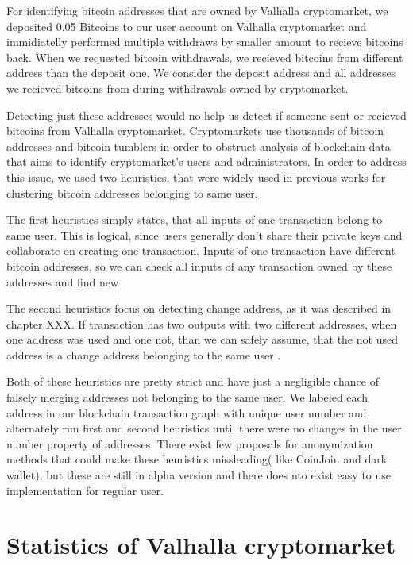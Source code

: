 \documentclass[
  digital, %
  table,   %
  lof,     %
  lot,     %
  oneside
]{fithesis3}
\begin{document}
For identifying bitcoin addresses that are owned by Valhalla cryptomarket, we 
deposited 0.05 Bitcoins to our user account on Valhalla cryptomarket and immidiatelly
performed multiple withdraws by smaller amount to recieve bitcoins back.
When we requested bitcoin withdrawals, we recieved bitcoins from different address
than the deposit one. We consider the deposit address and all addresses we recieved
bitcoins from during withdrawals owned by cryptomarket.

Detecting just these addresses would no help us detect
if someone sent or recieved bitcoins from Valhalla cryptomarket.
Cryptomarkets use thousands of bitcoin addresses and
bitcoin tumblers in order to obstruct analysis of blockchain data
that aims to identify cryptomarket's users and administrators.
In order to address this issue, we used two heuristics, that were widely used
in previous works \parencite{androulaki2013evaluating}\parencite{reid2013analysis}
for clustering bitcoin addresses belonging to same user.

The first heuristics simply states, that all inputs of one transaction belong to same user. This is logical,
since users generally don't share their private keys and collaborate on creating one transaction.
Inputs of one transaction have different bitcoin addresses, so we can check all inputs of any transaction
owned by these addresses and find new 

The second heuristics focus on detecting change address, as it was described in chapter XXX.
If transaction has two outputs with two different addresses, when one address was used and one not,
than we can safely assume, that the not used address is a change address belonging to the same user \parencite{androulaki2013evaluating}.

Both of these heuristics are pretty strict and have just a negligible chance of falsely merging
addresses not belonging to the same user.
We labeled each address in our blockchain transaction graph with unique user number
and alternately run first and second heuristics until there were no changes in the user number property of addresses.
There exist few proposals for anonymization methods that could make
these heuristics missleading( like CoinJoin and dark wallet), but
these are still in alpha version and there does nto exist easy to use implementation for regular user. 

\chapter{Statistics of Valhalla cryptomarket}
\end{document}
